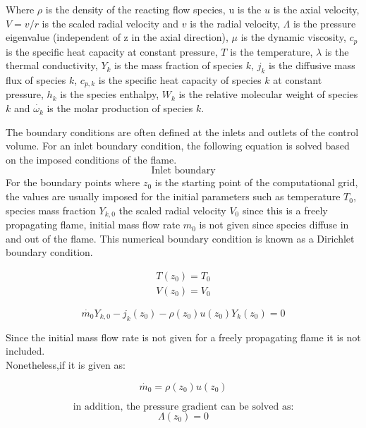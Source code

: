 Where $\rho$ is the density of the reacting flow species, u is the $u$ is the axial velocity, $V=v/r$ is the scaled radial velocity and $v$ is the radial velocity, $\Lambda$ is the pressure eigenvalue (independent of z in the axial direction), $\mu$ is the dynamic viscosity, $c_p$ is the specific heat capacity at constant pressure, $T$ is the temperature, $\lambda$ is the thermal conductivity, $Y_k$ is the mass fraction of species $k$, $j_k$ is the diffusive mass flux of species $k$, $c_{p,k}$ is the specific heat capacity of species $k$ at constant pressure, $h_k$ is the species enthalpy, $W_k$ is the relative molecular weight of species $k$ and $\Dot{\omega_k}$ is the molar production of species $k$. \hfill \break 


The boundary conditions are often defined at the inlets and outlets of the control volume. For an inlet boundary condition, the following equation is solved based on the imposed conditions of the flame.
\[\text{Inlet boundary}\]
For the boundary points where $z_0$ is the starting point of the computational grid, the values are usually imposed for the initial parameters such as temperature $T_0$, species mass fraction $Y_{k,0}$ the scaled radial velocity $V_0$ since this is a freely propagating flame, initial mass flow rate $m_0$ is not given since species diffuse in and out of the flame. This numerical boundary condition is known as a Dirichlet boundary condition.

\begin{align}
    T(z_0)=T_0   \\
    V(z_0)=V_0
\end{align}

\begin{equation}
    \Dot{m_0}Y_{k,0}-j_k(z_0)-\rho(z_0)u(z_0)Y_k(z_0)=0
\end{equation}

Since the initial mass flow rate is not given for a freely propagating flame it is not included.\\ Nonetheless,if it is given as:

\begin{equation}
    \Dot{m_0}=\rho(z_0)u(z_0)
\end{equation}
 
\[\text{in addition, the pressure gradient can be solved as:}\]
\begin{equation}
    \Lambda(z_0)=0
\end{equation}

